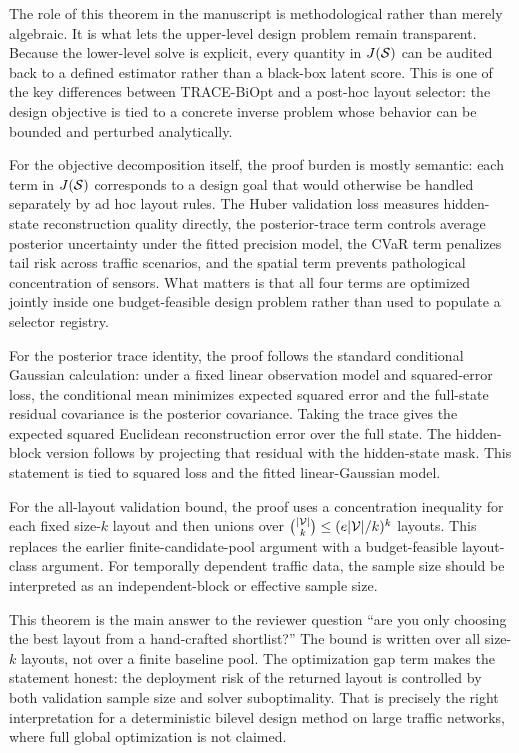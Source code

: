 The role of this theorem in the manuscript is methodological rather than merely
algebraic. It is what lets the upper-level design problem remain transparent.
Because the lower-level solve is explicit, every quantity in $J(\mathcal{S})$ can be
audited back to a defined estimator rather than a black-box latent score. This
is one of the key differences between TRACE-BiOpt and a post-hoc layout
selector:
the design objective is tied to a concrete inverse problem whose behavior can be
bounded and perturbed analytically.

For the objective decomposition itself, the proof burden is mostly semantic:
each term in $J(\mathcal{S})$ corresponds to a design goal that would otherwise be
handled separately by ad hoc layout rules. The Huber validation loss measures
hidden-state reconstruction quality directly, the posterior-trace term controls
average posterior uncertainty under the fitted precision model, the CVaR term
penalizes tail risk across traffic scenarios, and the spatial term prevents
pathological concentration of sensors.
What matters is that all four terms are optimized jointly inside one
budget-feasible design problem rather than used to populate a selector
registry.

For the posterior trace identity, the proof follows the standard conditional
Gaussian calculation: under a fixed linear observation model and squared-error
loss, the conditional mean minimizes expected squared error and the full-state
residual covariance is the posterior covariance. Taking the trace gives the
expected squared Euclidean reconstruction error over the full state. The
hidden-block version follows by projecting that residual with the hidden-state
mask. This statement is tied to squared loss and the fitted linear-Gaussian
model.

For the all-layout validation bound, the proof uses a concentration inequality
for each fixed size-$k$ layout and then unions over
$\binom{|\mathcal{V}|}{k}\le(e|\mathcal{V}|/k)^k$ layouts. This replaces the earlier
finite-candidate-pool argument with a budget-feasible layout-class argument.
For temporally dependent traffic data, the sample size should be interpreted as
an independent-block or effective sample size.

This theorem is the main answer to the reviewer question ``are you only
choosing the best layout from a hand-crafted shortlist?'' The bound is written
over all size-$k$ layouts, not over a finite baseline pool. The optimization
gap term makes the statement honest: the deployment risk of the returned layout
is controlled by both validation sample size and solver suboptimality. That is
precisely the right interpretation for a deterministic bilevel design method on
large traffic networks, where full global optimization is not claimed.

